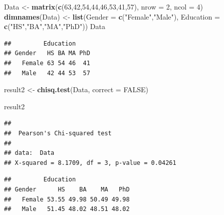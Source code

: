 \documentclass[
]{book}
\newenvironment{Shaded}{\begin{snugshade}}{\end{snugshade}}
\newcommand{\AttributeTok}[1]{\textcolor[rgb]{0.13,0.29,0.53}{#1}}
\newcommand{\ConstantTok}[1]{\textcolor[rgb]{0.56,0.35,0.01}{#1}}
\newcommand{\DecValTok}[1]{\textcolor[rgb]{0.00,0.00,0.81}{#1}}
\newcommand{\DocumentationTok}[1]{\textcolor[rgb]{0.56,0.35,0.01}{\textbf{\textit{#1}}}}
\newcommand{\FunctionTok}[1]{\textcolor[rgb]{0.13,0.29,0.53}{\textbf{#1}}}
\newcommand{\NormalTok}[1]{#1}
\newcommand{\OtherTok}[1]{\textcolor[rgb]{0.56,0.35,0.01}{#1}}
\newcommand{\SpecialCharTok}[1]{\textcolor[rgb]{0.81,0.36,0.00}{\textbf{#1}}}
\newcommand{\StringTok}[1]{\textcolor[rgb]{0.31,0.60,0.02}{#1}}
\theoremstyle{definition}
\theoremstyle{definition}
\theoremstyle{definition}
\theoremstyle{definition}
\theoremstyle{remark}
\begin{document}
\begin{Shaded}
\begin{Highlighting}[]
\NormalTok{Data }\OtherTok{\textless{}{-}} \FunctionTok{matrix}\NormalTok{(}\FunctionTok{c}\NormalTok{(}\DecValTok{63}\NormalTok{,}\DecValTok{42}\NormalTok{,}\DecValTok{54}\NormalTok{,}\DecValTok{44}\NormalTok{,}\DecValTok{46}\NormalTok{,}\DecValTok{53}\NormalTok{,}\DecValTok{41}\NormalTok{,}\DecValTok{57}\NormalTok{), }\AttributeTok{nrow =} \DecValTok{2}\NormalTok{, }\AttributeTok{ncol =} \DecValTok{4}\NormalTok{)}
\FunctionTok{dimnames}\NormalTok{(Data) }\OtherTok{\textless{}{-}} \FunctionTok{list}\NormalTok{(}\AttributeTok{Gender =} \FunctionTok{c}\NormalTok{(}\StringTok{"Female"}\NormalTok{,}\StringTok{"Male"}\NormalTok{), }
                    \AttributeTok{Education =} \FunctionTok{c}\NormalTok{(}\StringTok{"HS"}\NormalTok{,}\StringTok{"BA"}\NormalTok{,}\StringTok{"MA"}\NormalTok{,}\StringTok{"PhD"}\NormalTok{))}
\NormalTok{Data}
\end{Highlighting}
\end{Shaded}

\begin{verbatim}
##         Education
## Gender   HS BA MA PhD
##   Female 63 54 46  41
##   Male   42 44 53  57
\end{verbatim}

\begin{Shaded}
\begin{Highlighting}[]
\NormalTok{result2 }\OtherTok{\textless{}{-}} \FunctionTok{chisq.test}\NormalTok{(Data, }\AttributeTok{correct =} \ConstantTok{FALSE}\NormalTok{)}

\NormalTok{result2}
\end{Highlighting}
\end{Shaded}

\begin{verbatim}
## 
##  Pearson's Chi-squared test
## 
## data:  Data
## X-squared = 8.1709, df = 3, p-value = 0.04261
\end{verbatim}

\begin{Shaded}
\end{Shaded}

\begin{verbatim}
##         Education
## Gender      HS    BA    MA   PhD
##   Female 53.55 49.98 50.49 49.98
##   Male   51.45 48.02 48.51 48.02
\end{verbatim}
\end{document}
